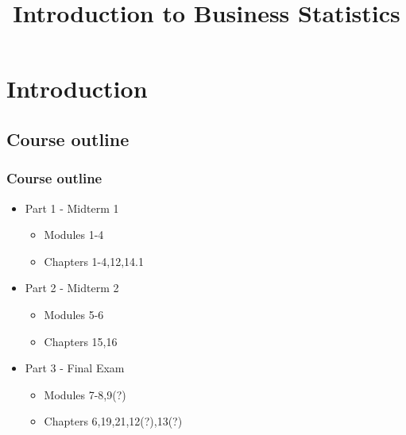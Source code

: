 \documentclass[handout]{beamer}
\title{Introduction to Business Statistics}
\begin{document}
\begin{frame}
\titlepage
\end{frame}


\section{Introduction}
\subsection{Course outline}
\begin{frame}
\frametitle{Course outline}

\begin{itemize}
\item Part 1 - Midterm 1
  \begin{itemize}
  \item Modules 1-4
  \item Chapters 1-4,12,14.1
  \end{itemize}
\item Part 2 - Midterm 2
  \begin{itemize}
  \item Modules 5-6
  \item Chapters 15,16
  \end{itemize}
\item Part 3 - Final Exam
  \begin{itemize}
  \item Modules 7-8,9(?)
  \item Chapters 6,19,21,12(?),13(?)
  \end{itemize}
\end{itemize}

\end{frame}
\end{document}
